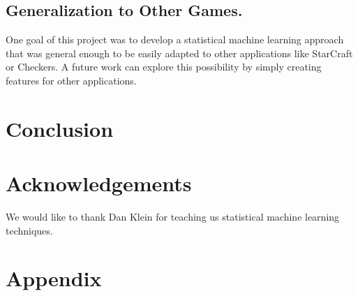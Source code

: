 \documentclass[11pt]{article}
\begin{document}
\subsection{Generalization to Other Games.}
One goal of this project was to develop a statistical machine learning approach that was general enough to be easily adapted to other applications like StarCraft or Checkers. A future work can explore this possibility by simply creating features for other applications.

\section{Conclusion}

\section{Acknowledgements}
We would like to thank Dan Klein for teaching us statistical machine learning techniques.
\section*{Appendix}



\end{document}

